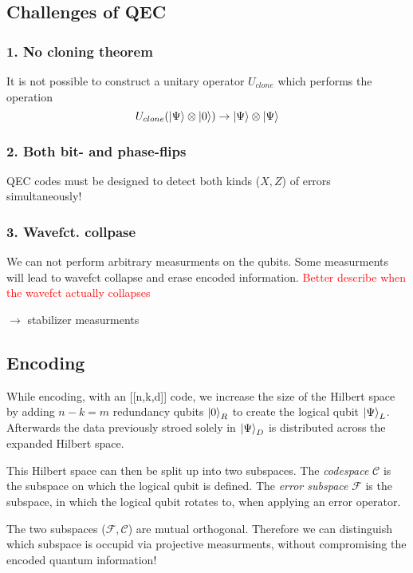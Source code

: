 \subsection{Challenges of QEC}
\subsubsection{1. No cloning theorem}
It is not possible to construct a unitary operator $U_{clone}$ which performs the operation
\begin{equation}
    U_{clone}(\ket{\Psi} \otimes \ket{0}) \rightarrow \ket{\Psi} \otimes\ket{\Psi}
\end{equation}

\subsubsection{2. Both bit- and phase-flips}
QEC codes must be designed to detect both kinds ($X,Z$) of errors simultaneously!

\subsubsection{3. Wavefct. collpase}
We can not perform arbitrary measurments on the qubits. 
Some measurments will lead to wavefct collapse and erase encoded information.
\textcolor{red}{Better describe when the wavefct actually collapses}

$\rightarrow$ stabilizer measurments

\subsection{Encoding}

While encoding, with an [[n,k,d]] code, we increase the size of the Hilbert space by adding $n-k=m$ redundancy qubits $\ket{0}_R$
to create the logical qubit $\ket{\Psi}_L$. 
Afterwards the data previously stroed solely in $\ket{\Psi}_D$ is distributed across the expanded Hilbert space.

This Hilbert space can then be split up into two subspaces. 
The \textit{codespace} $\mathcal{C}$ is the subspace on which the logical qubit is defined.
The \textit{error subspace} $\mathcal{F}$ is the subspace, in which the logical qubit rotates to, when applying an error operator. 

The two subspaces ($\mathcal{F} , \mathcal{C}$) are mutual orthogonal. 
Therefore we can distinguish which subspace is occupid via projective measurments, 
without compromising the encoded quantum information! 

